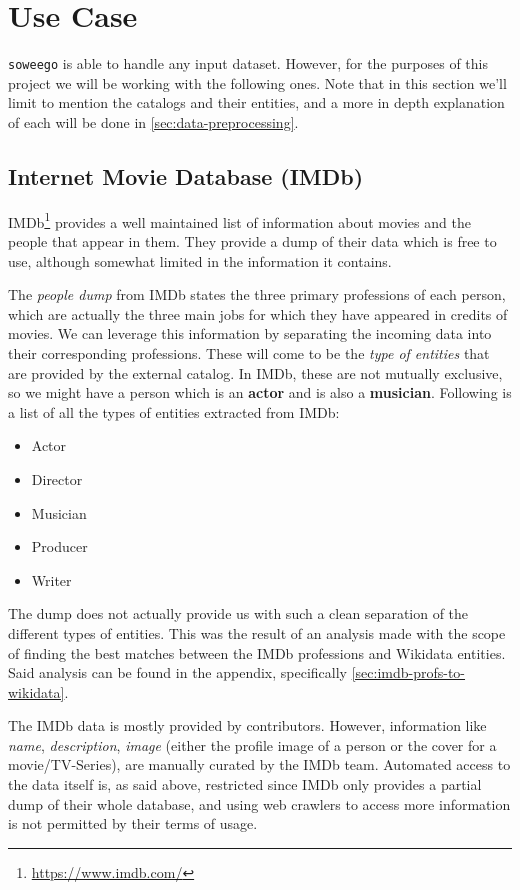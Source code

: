 \documentclass[epsfig,a4paper,11pt,titlepage,twoside,openany]{book}
\newcommand{\footurl}[1]{\footnote{\url{#1}}}
\begin{document}
\section{Use Case}
\label{sec:statement-use-case}

\texttt{soweego} is able to handle any input dataset. However, for the purposes of this project we will be working with the following ones. Note that in this section we'll limit to mention the catalogs and their entities, and a more in depth explanation of each will be done in \autoref{sec:data-preprocessing}. 

\subsection{Internet Movie Database (IMDb)}
\label{sec:catalog-imdb}

IMDb\footurl{https://www.imdb.com/} provides a well maintained list of information about movies and the people that appear in them. They provide a dump of their data which is free to use, although somewhat limited in the information it contains.

The \textit{people dump} from IMDb states the three primary professions of each person, which are actually the three main jobs for which they have appeared in credits of movies. We can leverage this information by separating the incoming data into their corresponding professions. These will come to be the \textit{type of entities} that are provided by the external catalog. In IMDb, these are not mutually exclusive, so we might have a person which is an \textbf{actor} and is also a \textbf{musician}. Following is a list of all the types of entities extracted from IMDb: 

\begin{itemize}
\item Actor
\item Director
\item Musician
\item Producer
\item Writer
\end{itemize}

The dump does not actually provide us with such a clean separation of the different types of entities. This was the result of an analysis made with the scope of finding the best matches between the IMDb professions and Wikidata entities. Said analysis can be found in the appendix, specifically \autoref{sec:imdb-profs-to-wikidata}. 

The IMDb data is mostly provided by contributors. However, information like \textit{name}, \textit{description}, \textit{image} (either the profile image of a person or the cover for a movie/TV-Series), are manually curated by the IMDb team. Automated access to the data itself is, as said above, restricted since IMDb only provides a partial dump of their whole database, and using web crawlers to access more information is not permitted by their terms of usage.
\end{document}
